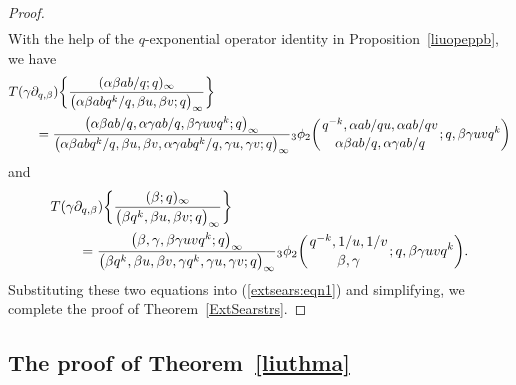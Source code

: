 \documentclass[10pt,a4paper]{amsart}
\numberwithin{equation}{section}
\begin{document}
\begin{proof}
\begin{align}
\label{extsears:eqn1}
\end{align}
With the help of the $q$-exponential operator identity in Proposition~\ref{liuopeppb}, we have
\begin{align*}
& T(\gamma \partial_{q, \beta}) \biggl\{ \frac{(\alpha \beta ab/q; q)_\infty}{\bigl(\alpha \beta ab q^k/q, \beta u, \beta v; q\bigr)_\infty} \biggr\}\\
&\qquad{}=\frac{\bigl(\alpha \beta ab/q, \alpha \gamma ab/q, \beta \gamma uvq^k; q\bigr)_\infty}
{\bigl(\alpha \beta ab q^k/q, \beta u, \beta v, \alpha \gamma ab q^k/q, \gamma u, \gamma v; q\bigr)_\infty}
 {_3\phi_2} \biggl({{q^{-k}, \alpha ab/qu, \alpha ab/qv}
\atop{\alpha \beta ab/q, \alpha \gamma ab/q }}; q, \beta \gamma uv q^k \biggr)
\end{align*}
and
\begin{align*}
& T(\gamma \partial_{q, \beta}) \biggl\{ \frac{(\beta; q)_\infty}{\bigl(\beta q^k, \beta u, \beta v; q\bigr)_\infty}
 \biggr\}\\
&\qquad{}=\frac{\bigl(\beta, \gamma, \beta \gamma uvq^k; q\bigr)_\infty}
{\bigl(\beta q^k, \beta u, \beta v, \gamma q^k, \gamma u, \gamma v; q\bigr)_\infty}
{_3\phi_2 \biggl({{q^{-k}, 1/u, 1/v}\atop{\beta, \gamma}}; q, \beta \gamma uv q^k\biggr)}.
\end{align*}
Substituting these two equations into (\ref{extsears:eqn1}) and simplifying, we complete
the proof of Theorem~\ref{ExtSearstrs}.
\end{proof}

\subsection{The proof of Theorem~\ref{liuthma}}
\end{document}

